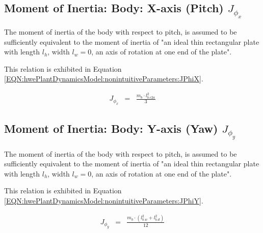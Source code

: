 \documentclass[crop=false,float=true,class=scrreprt]{standalone}
\begin{document}
\subsection{Moment of Inertia: Body: X-axis (Pitch)  $J_{\phi_{x}}$}
\label{SEC:hwePlantDynamicsModel:nonintuitiveParameters:momentOfInertia:bPhiX}

The moment of inertia of the body with respect to pitch,
is assumed to be sufficiently equivalent to 
the moment of inertia of 
"an ideal thin rectangular plate 
with length $l_{h}$, width $l_{w} = 0$,
an axis of rotation at one end of the plate".

This relation is exhibited in Equation~%
\eqref{EQN:hwePlantDynamicsModel:nonintuitiveParameters:JPhiX}.




\begin{equation}
\label{EQN:hwePlantDynamicsModel:nonintuitiveParameters:JPhiX}
\begin{array}{ccc}
J_{\phi_{x}}
& = &
\displaystyle\frac{m_{b} \cdot l_{b.c2a}^{2}}{3}
\end{array}
\end{equation}




\vspace{+2em}





\subsection{Moment of Inertia: Body: Y-axis (Yaw)  $J_{\phi_{y}}$}
\label{SEC:hwePlantDynamicsModel:nonintuitiveParameters:momentOfInertia:bPhiY}

The moment of inertia of the body with respect to pitch,
is assumed to be sufficiently equivalent to 
the moment of inertia of 
"an ideal thin rectangular plate 
with length $l_{h}$, width $l_{w} = 0$,
an axis of rotation at one end of the plate".

This relation is exhibited in Equation~%
\eqref{EQN:hwePlantDynamicsModel:nonintuitiveParameters:JPhiY}.




\begin{equation}
\label{EQN:hwePlantDynamicsModel:nonintuitiveParameters:JPhiY}
\begin{array}{ccc}
J_{\phi_{y}}
& = &
\displaystyle\frac{m_{b} \cdot ( l_{b.w}^{2} + l_{b.d}^{2} )}{12}
\end{array}
\end{equation}




\clearpage
\end{document}
